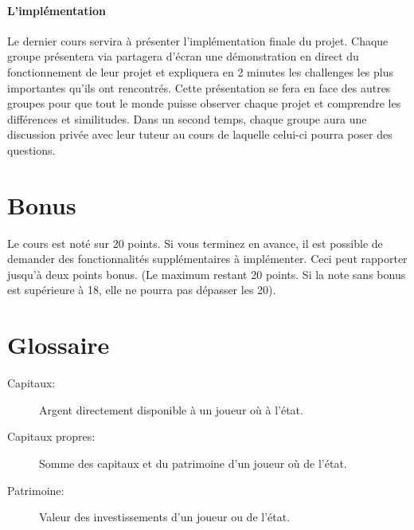 \documentclass[12pt]{article}
\begin{document}
	\paragraph{L'implémentation}
		Le dernier cours servira à présenter l'implémentation finale du projet. Chaque groupe présentera via partagera d'écran une démonstration en direct du fonctionnement de leur projet et expliquera en 2 minutes les challenges les plus importantes qu'ils ont rencontrés. 
		Cette présentation se fera en face des autres groupes pour que tout le monde puisse observer chaque projet et comprendre les différences et similitudes. 
		Dans un second temps, chaque groupe aura une discussion privée avec leur tuteur au cours de laquelle celui-ci pourra poser des questions.
			
	
	
	\section{Bonus}
	
	Le cours est noté sur 20 points. 
	Si vous terminez en avance, il est possible de demander des fonctionnalités supplémentaires à implémenter. Ceci peut rapporter jusqu'à deux points bonus. (Le maximum restant 20 points. Si la note sans bonus est supérieure à 18, elle ne pourra pas dépasser les 20).
	
	\section{Glossaire}
	 \begin{description} 
 	\item [Capitaux:] Argent directement disponible à un joueur où à l'état.
	\item [Capitaux propres:] Somme des capitaux et du patrimoine d'un joueur où de l'état.
	\item [Patrimoine:] Valeur des investissements d'un joueur ou de l'état.
\end{description}
	
	
\end{document}
